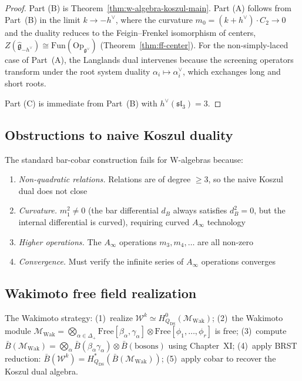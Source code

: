 \begin{proof}
Part (B) is Theorem~\ref{thm:w-algebra-koszul-main}.  Part (A) follows from Part~(B) in the limit $k \to -h^\vee$, where the curvature $m_0 = (k+h^\vee) \cdot C_2 \to 0$ and the duality reduces to the Feigin--Frenkel isomorphism of centers, $Z(\widehat{\mathfrak{g}}_{-h^\vee}) \cong \mathrm{Fun}(\mathrm{Op}_{\mathfrak{g}^\vee})$ (Theorem~\ref{thm:ff-center}).  For the non-simply-laced case of Part~(A), the Langlands dual intervenes because the screening operators transform under the root system duality $\alpha_i \mapsto \alpha_i^\vee$, which exchanges long and short roots.

Part (C) is immediate from Part~(B) with $h^\vee(\mathfrak{sl}_3) = 3$.
\end{proof}

\subsection{Obstructions to naive Koszul duality}

\begin{remark}
The standard bar-cobar construction fails for W-algebras because:
\begin{enumerate}
\item \emph{Non-quadratic relations.} Relations are of degree $\geq 3$, so the naive Koszul dual does not close
\item \emph{Curvature.} $m_1^2 \neq 0$ (the bar differential $d_B$ always satisfies $d_B^2 = 0$, but the internal differential is curved), requiring curved $A_\infty$ technology
\item \emph{Higher operations.} The $A_\infty$ operations $m_3, m_4, \ldots$ are all non-zero
\item \emph{Convergence.} Must verify the infinite series of $A_\infty$ operations converges
\end{enumerate}
\end{remark}

\subsection{Wakimoto free field realization}

\begin{remark}
The Wakimoto strategy: (1)~realize $\mathcal{W}^k \simeq H^0_{Q_{\text{DS}}}(\mathcal{M}_{\text{Wak}})$; (2)~the Wakimoto module $\mathcal{M}_{\text{Wak}} = \bigotimes_{\alpha \in \Delta_+} \text{Free}[\beta_\alpha, \gamma_\alpha] \otimes \text{Free}[\phi_1, \ldots, \phi_r]$ is free; (3)~compute $\bar{B}(\mathcal{M}_{\text{Wak}}) = \bigotimes_\alpha \bar{B}(\beta_\alpha\gamma_\alpha) \otimes \bar{B}(\text{bosons})$ using Chapter~XI; (4)~apply BRST reduction: $\bar{B}(\mathcal{W}^k) = H^*_{Q_{\text{DS}}}(\bar{B}(\mathcal{M}_{\text{Wak}}))$; (5)~apply cobar to recover the Koszul dual algebra.
\end{remark}

